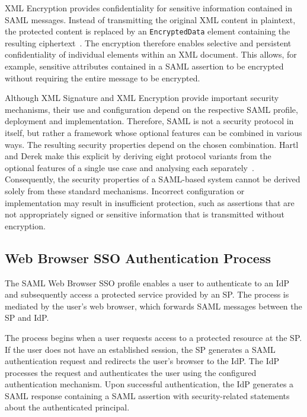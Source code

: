 \documentclass[../main.tex]{subfiles}
\begin{document}
XML Encryption provides confidentiality for sensitive information contained in SAML messages. 
Instead of transmitting the original XML content in plaintext, the protected content is replaced by 
an \texttt{EncryptedData} element containing the resulting ciphertext~\cite{W3CXMLENC}. 
The encryption therefore enables selective and persistent confidentiality of individual elements within 
an XML document. 
This allows, for example, sensitive attributes contained in a SAML assertion to be encrypted without 
requiring the entire message to be encrypted.

Although XML Signature and XML Encryption provide important security mechanisms, their use and 
configuration depend on the respective SAML profile, deployment and implementation. 
Therefore, SAML is not a security protocol in itself, but rather a framework whose optional features 
can be combined in various ways. 
The resulting security properties depend on the chosen combination. 
Hartl and Derek make this explicit by deriving eight protocol variants from the optional features 
of a single use case and analysing each separately~\cite{FormalSecAnalysisSAML}. 
Consequently, the security properties of a SAML-based system cannot be derived solely from these 
standard mechanisms. 
Incorrect configuration or implementation may result in insufficient protection, such as assertions 
that are not appropriately signed or sensitive information that is transmitted without encryption. 

\subsection{Web Browser SSO Authentication Process}\label{subsec:sso-auth-process}

The SAML Web Browser SSO profile enables a user to authenticate to an IdP and subsequently access a 
protected service provided by an SP. 
The process is mediated by the user's web browser, which forwards SAML messages between the SP and IdP. 

The process begins when a user requests access to a protected resource at the SP. 
If the user does not have an established session, the SP generates a SAML authentication request and 
redirects the user's browser to the IdP. 
The IdP processes the request and authenticates the user using the configured authentication mechanism. 
Upon successful authentication, the IdP generates a SAML response containing a SAML assertion with 
security-related statements about the authenticated principal.
\end{document}
